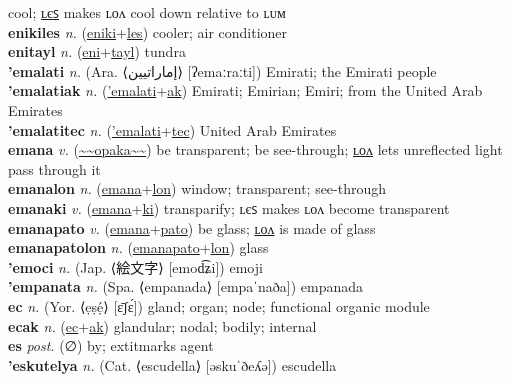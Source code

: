 cool; \hyperref[enikiles]{ʟєꜱ} makes ʟᴏᴧ cool down relative to ʟᴜᴍ \label{eniki} \\
\textbf{enikiles} \textit{n.} (\hyperref[eniki]{eniki}+\hyperref[les]{les})
cooler; air conditioner \label{enikiles} \\
\textbf{enitayl} \textit{n.} (\hyperref[eni]{eni}+\hyperref[tayl]{tayl})
tundra \label{enitayl} \\
\textbf{'emalati} \textit{n.} (Ara. ⟨إماراتيين‎⟩ [ʔemaːraːti])
Emirati; the Emirati people \label{'emalati} \\
\textbf{'emalatiak} \textit{n.} (\hyperref['emalati]{'emalati}+\hyperref[ak]{ak})
Emirati; Emirian; Emiri; from the United Arab Emirates \label{'emalatiak} \\
\textbf{'emalatitec} \textit{n.} (\hyperref['emalati]{'emalati}+\hyperref[tec]{tec})
United Arab Emirates \label{'emalatitec} \\
\textbf{emana} \textit{v.} (\hyperref[opaka]{\~{}\~{}opaka\~{}\~{}})
be transparent; be see-through; \hyperref[emanalon]{ʟᴏᴧ} lets unreflected light pass through it \label{emana} \\
\textbf{emanalon} \textit{n.} (\hyperref[emana]{emana}+\hyperref[lon]{lon})
window; transparent; see-through \label{emanalon} \\
\textbf{emanaki} \textit{v.} (\hyperref[emana]{emana}+\hyperref[ki]{ki})
transparify; ʟєꜱ makes ʟᴏᴧ become transparent \label{emanaki} \\
\textbf{emanapato} \textit{v.} (\hyperref[emana]{emana}+\hyperref[pato]{pato})
be glass; \hyperref[emanapatolon]{ʟᴏᴧ} is made of glass \label{emanapato} \\
\textbf{emanapatolon} \textit{n.} (\hyperref[emanapato]{emanapato}+\hyperref[lon]{lon})
glass \label{emanapatolon} \\
\textbf{'emoci} \textit{n.} (Jap. ⟨絵文字⟩ [emod͡ʑi])
emoji \label{'emoci} \\
\textbf{'empanata} \textit{n.} (Spa. ⟨empanada⟩ [empaˈnaða])
empanada \label{'empanata} \\
\textbf{ec} \textit{n.} (Yor. ⟨ẹṣẹ́⟩ [ɛ̄ʃɛ́])
gland; organ; node; functional organic module \label{ec} \\
\textbf{ecak} \textit{n.} (\hyperref[ec]{ec}+\hyperref[ak]{ak})
glandular; nodal; bodily; internal \label{ecak} \\
\textbf{es} \textit{post.} (∅)
by; 	extit{marks agent} \label{es} \\
\textbf{'eskutelya} \textit{n.} (Cat. ⟨escudella⟩ [əskuˈðeʎə])
escudella \label{'eskutelya} \\
